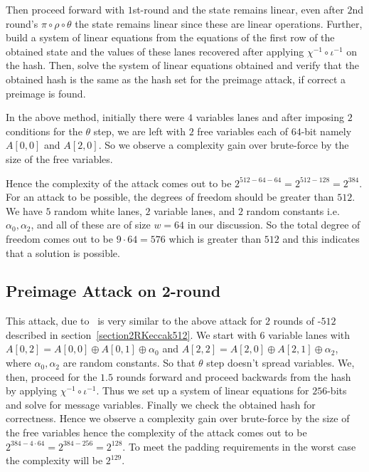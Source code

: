 Then proceed forward with $1$st-round and the state remains linear, even after $2$nd round's $\pi \circ \rho \circ \theta$ the state remains linear since these are linear operations.
Further, build a system of linear equations from the equations of the first row of the obtained state and the values of these lanes recovered after applying $\chi^{-1} \circ \iota^{-1}$ on the hash. Then, solve the system of linear equations obtained and verify that the obtained hash is the same as the hash set for the preimage attack, if correct a preimage is found.
        
In the above method, initially there were $4$ variables lanes and after imposing $2$ conditions for the $\theta$ step, we are left with $2$ free variables each of $64$-bit namely $A[0,0]$ and $A[2, 0]$. So we observe a complexity gain over brute-force by the size of the free variables.

Hence the complexity of the attack comes out to be $2^{512 - 64 - 64} = 2^{512 - 128} = 2^{384}$. For an attack to be possible, the degrees of freedom should be greater than $512$. We have $5$ random white lanes, $2$ variable lanes, and $2$ random constants i.e. $\alpha_{0}, \alpha_{2}$, and all of these are of size $w = 64$ in our discussion. So the total degree of freedom comes out to be $ 9 \cdot 64 = 576$ which is greater than $512$ and this indicates that a solution is possible.

\subsection{Preimage Attack on 2-round }
\label{section2RKeccak384}
This attack, due to~\cite{guo2016linear} is very similar to the above attack for $2$ rounds of \KECCAK-$512$ described in section~\ref{section2RKeccak512}. We start with $6$ variable lanes with $A[0, 2] = A[0, 0] \oplus A[0, 1] \oplus \alpha_0$ and $A[2, 2] = A[2, 0] \oplus A[2, 1] \oplus \alpha_2$, where $\alpha_{0}, \alpha_{2}$ are random constants. So that $\theta$ step doesn't spread variables. We, then, proceed for the $1.5$ rounds forward and proceed backwards from the hash by applying $\chi^{-1} \circ \iota^{-1}$. Thus we set up a system of linear equations for $256$-bits and solve for message variables. Finally we check the obtained hash for correctness. Hence we observe a complexity gain over brute-force by the size of the free variables hence the complexity of the attack comes out to be $2^{384 - 4 \cdot 64} = 2^{384 - 256} = 2^{128}$. To meet the padding requirements in the worst case the complexity will be $2^{129}$.

